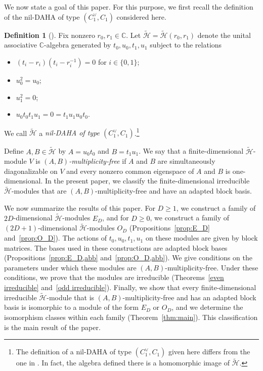 \documentclass[reqno]{amsart}
\theoremstyle{definition}
\newtheorem{definition}[theorem]{Definition}
\begin{document}
We now state a goal of this paper.
For this purpose, we first recall the definition of the nil-DAHA of type
$(C_1^\vee,C_1)$ considered here.
\begin{definition}[{\cite[Definition~5.1]{LeeTanakaSLC}}]\label{nil.H}
Fix nonzero $r_0,r_1\in\mathbb{C}$.
Let $\widetilde{\mathcal{H}}=\widetilde{\mathcal{H}}(r_0,r_1)$ denote
the unital associative $\mathbb{C}$-algebra generated by
$t_0,u_0,t_1,u_1$ subject to the relations
\begin{itemize}
\item[(i)] $(t_i-r_i)(t_i-r_i^{-1})=0$ for $i\in\{0,1\}$;
\item[(ii)] $u_0^2=u_0$;
\item[(iii)] $u_1^2=0$;
\item[(iv)] $u_0t_0t_1u_1=0=t_1u_1u_0t_0$.
\end{itemize}
We call $\widetilde{\mathcal{H}}$ a \emph{nil-DAHA of type
$(C_1^\vee,C_1)$}.\footnote{The definition of a nil-DAHA of type
$(C_1^\vee,C_1)$ given here differs from the one in
\cite[Definition~8.1]{LeeTanaka}. In fact, the algebra defined there is a
homomorphic image of $\widetilde{\mathcal H}$.}
\end{definition}
\noindent
Define $A,B\in\widetilde{\mathcal H}$ by $A=u_0t_0$ and $B=t_1u_1$.
We say that a finite-dimensional $\widetilde{\mathcal H}$-module $V$ is
\emph{$(A,B)$-multiplicity-free} if $A$ and $B$ are simultaneously
diagonalizable on $V$ and every nonzero common eigenspace of $A$ and $B$
is one-dimensional.
In the present paper, we classify the finite-dimensional irreducible
$\widetilde{\mathcal H}$-modules that are $(A,B)$-multiplicity-free and
have an adapted block basis.

We now summarize the results of this paper.
For $D\geq 1$, we construct a family of $2D$-dimensional
$\widetilde{\mathcal H}$-modules $E_D$, and for $D\geq 0$, we construct
a family of $(2D+1)$-dimensional $\widetilde{\mathcal H}$-modules
$O_D$ (Propositions~\ref{prop:E_D} and~\ref{prop:O_D}).
The actions of $t_0,u_0,t_1,u_1$ on these modules are given by block
matrices.
The bases used in these constructions are adapted block bases
(Propositions~\ref{prop:E_D,abb} and~\ref{prop:O_D,abb}).
We give conditions on the parameters under which these modules are
$(A,B)$-multiplicity-free.
Under these conditions, we prove that the modules are irreducible
(Theorems~\ref{even irreducible} and~\ref{odd irreducible}).
Finally, we show that every finite-dimensional irreducible
$\widetilde{\mathcal H}$-module that is $(A,B)$-multiplicity-free and
has an adapted block basis is isomorphic to a module of the form $E_D$
or $O_D$, and we determine the isomorphism classes within each family
(Theorem~\ref{thm:main}).
This classification is the main result of the paper.
\end{document}
